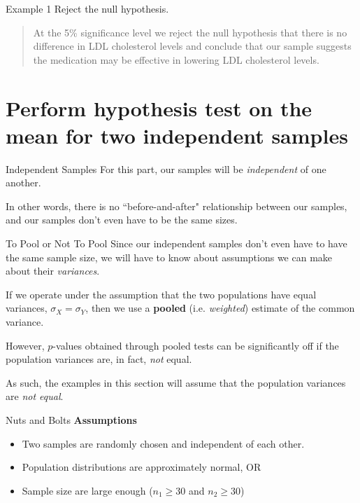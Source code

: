 \documentclass[t]{beamer}
\begin{document}
\begin{frame}{Example 1}
Reject the null hypothesis.		\newline\\	\pause
\begin{quote}
At the 5\% significance level we reject the null hypothesis that there is no difference in LDL cholesterol levels and conclude that our sample suggests the medication may be effective in lowering LDL cholesterol levels.
\end{quote}
\end{frame}

\section{Perform hypothesis test on the mean for two independent samples}

\begin{frame}{Independent Samples}
For this part, our samples will be \emph{independent} of one another.	\newline\\	\pause

In other words, there is no ``before-and-after" relationship between our samples, and our samples don't even have to be the same sizes.
\end{frame}

\begin{frame}{To Pool or Not To Pool}
Since our independent samples don't even have to have the same sample size, we will have to know about assumptions we can make about their \emph{variances}. \newline\\	\pause

If we operate under the assumption that the two populations have equal variances, $\sigma_X = \sigma_Y$, then we use a \textbf{pooled} (i.e. \textit{weighted}) estimate of the common variance. \newline\\	\pause

However, $p$-values obtained through pooled tests can be significantly off if the population variances are, in fact, \emph{not} equal. \newline\\	\pause

As such, the examples in this section will assume that the population variances are \emph{not equal}.
\end{frame}

\begin{frame}{Nuts and Bolts}
\textbf{Assumptions}
\begin{itemize}
\item<2-> Two samples are randomly chosen and independent of each other.
\item<3-> Population distributions are approximately normal, OR
\item<4-> Sample size are large enough ($n_1 \geq 30$ and $n_2 \geq 30$)
\end{itemize}
\bigskip
{}
\end{frame}
\end{document}
